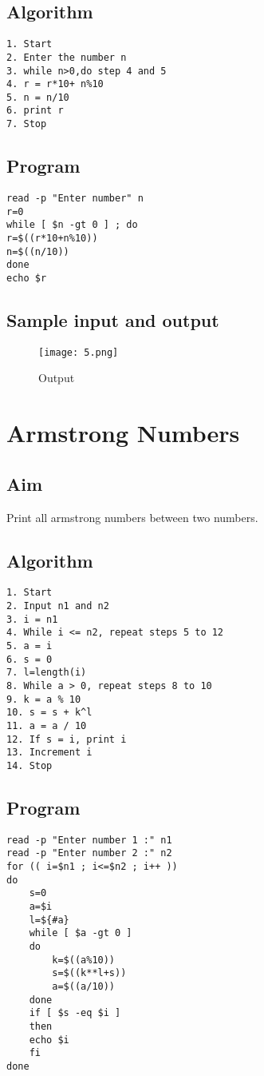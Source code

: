 \documentclass{article}
\begin{document}
\subsection{Algorithm}
\begin{Verbatim}[tabsize = 4]
1. Start
2. Enter the number n
3. while n>0,do step 4 and 5
4. r = r*10+ n%10
5. n = n/10
6. print r
7. Stop
\end{Verbatim}
\subsection{Program}
\begin{Verbatim}[tabsize = 4]
read -p "Enter number" n
r=0
while [ $n -gt 0 ] ; do
r=$((r*10+n%10))
n=$((n/10))
done
echo $r
\end{Verbatim}
\thispagestyle{third}
\subsection{Sample input and output}
\begin{figure}[H]
    \centering
    \texttt{[image: 5.png]}
    \caption{Output}
    \label{fig:my_label2}
\end{figure}

\section{\Large Armstrong Numbers}
\subsection{Aim}
Print all armstrong numbers between two numbers.
\subsection{Algorithm}
\begin{Verbatim}[tabsize = 4]
1. Start
2. Input n1 and n2
3. i = n1
4. While i <= n2, repeat steps 5 to 12
5. a = i
6. s = 0
7. l=length(i)
8. While a > 0, repeat steps 8 to 10
9. k = a % 10
10. s = s + k^l
11. a = a / 10
12. If s = i, print i
13. Increment i
14. Stop
\end{Verbatim}
\subsection{Program}
\begin{Verbatim}[tabsize = 4]
read -p "Enter number 1 :" n1
read -p "Enter number 2 :" n2
for (( i=$n1 ; i<=$n2 ; i++ ))
do
    s=0
    a=$i
    l=${#a}
    while [ $a -gt 0 ] 
    do
        k=$((a%10))
        s=$((k**l+s))
        a=$((a/10))
    done
    if [ $s -eq $i ]
    then
    echo $i
    fi
done
\end{Verbatim}
\thispagestyle{third}
\end{document}
